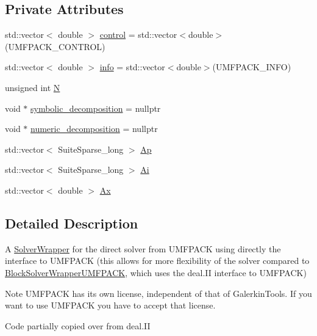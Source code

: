 \subsection*{Private Attributes}
\begin{DoxyCompactItemize}
\item 
std\+::vector$<$ double $>$ \hyperlink{class_block_solver_wrapper_u_m_f_p_a_c_k2_a295fca0b28991ae43c7bdfb72b5cdcb2}{control} = std\+::vector$<$double$>$(U\+M\+F\+P\+A\+C\+K\+\_\+\+C\+O\+N\+T\+R\+OL)
\item 
std\+::vector$<$ double $>$ \hyperlink{class_block_solver_wrapper_u_m_f_p_a_c_k2_a8dfbe8f5e1f1cf26460ba584b4eb02b6}{info} = std\+::vector$<$double$>$(U\+M\+F\+P\+A\+C\+K\+\_\+\+I\+N\+FO)
\item 
unsigned int \hyperlink{class_block_solver_wrapper_u_m_f_p_a_c_k2_a85d397826a36330bf3602d510acdd8d4}{N}
\item 
void $\ast$ \hyperlink{class_block_solver_wrapper_u_m_f_p_a_c_k2_a399387c1717404d92ed721fc31767f55}{symbolic\+\_\+decomposition} = nullptr
\item 
void $\ast$ \hyperlink{class_block_solver_wrapper_u_m_f_p_a_c_k2_ac3a439162324f36f5162439c075d02eb}{numeric\+\_\+decomposition} = nullptr
\item 
std\+::vector$<$ Suite\+Sparse\+\_\+long $>$ \hyperlink{class_block_solver_wrapper_u_m_f_p_a_c_k2_a18e53f152f97e51caab8dcf3efd5eaf1}{Ap}
\item 
std\+::vector$<$ Suite\+Sparse\+\_\+long $>$ \hyperlink{class_block_solver_wrapper_u_m_f_p_a_c_k2_a088fc386567b26c63b8d1a25a9319c75}{Ai}
\item 
std\+::vector$<$ double $>$ \hyperlink{class_block_solver_wrapper_u_m_f_p_a_c_k2_a57a4f7722dbbdd1ec2efa416f1cbb47c}{Ax}
\end{DoxyCompactItemize}


\subsection{Detailed Description}
A \hyperlink{class_solver_wrapper}{Solver\+Wrapper} for the direct solver from U\+M\+F\+P\+A\+CK using directly the interface to U\+M\+F\+P\+A\+CK (this allows for more flexibility of the solver compared to \hyperlink{class_block_solver_wrapper_u_m_f_p_a_c_k}{Block\+Solver\+Wrapper\+U\+M\+F\+P\+A\+CK}, which uses the deal.\+II interface to U\+M\+F\+P\+A\+CK)

\begin{DoxyNote}{Note}
U\+M\+F\+P\+A\+CK has its own license, independent of that of Galerkin\+Tools. If you want to use U\+M\+F\+P\+A\+CK you have to accept that license.
\end{DoxyNote}
Code partially copied over from deal.\+II 

